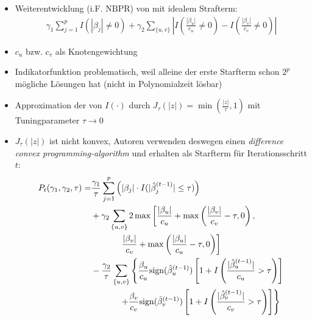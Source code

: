 \documentclass{beamer}
\begin{document}
\begin{frame}
	\begin{itemize}
	\item Weiterentwicklung (i.F. $\text{NBPR}$) von \cite{kim_network-based_2013} mit {\glqq}idealem{\grqq} Strafterm:
	\begin{align*}
	\gamma_1 \sum_{j=1}^{p}I(|\beta_j|\neq 0) + \gamma_2 \sum_{\{u,v\}}\left| I\left( \frac{|\beta_u|}{c_u} \neq 0 \right) - I\left( \frac{|\beta_v|}{c_v} \neq 0 \right) \right|
	\end{align*}
	\item $c_u$ bzw. $c_v$ als Knotengewichtung
	\item Indikatorfunktion problematisch, weil
	alleine der erste Starfterm schon $2^p$ mögliche Lösungen hat (nicht in Polynomialzeit lösbar)
	\item Approximation der von $I(\cdot)$ durch  $J_\tau(|z|)=\min (\frac{|z|}{\tau}, 1)$ mit Tuningparameter $\tau \rightarrow 0$
	\end{itemize}
\end{frame}


\begin{frame}
	\begin{itemize}
	\item $J_\tau(|z|)$ ist nicht konvex, Autoren verwenden deswegen einen \textit{difference convex programming-algorithm} und erhalten als Starfterm für Iterationsschritt $t$:
	\begin{align*}
	P_t(\gamma_1, \gamma_2, \tau) =& \frac{\gamma_1}{\tau} \sum_{j=1}^{p}\left(|\beta_j|\cdot I(|\hat{\beta}_j^{(t-1)}| \leq \tau)\right) \notag \\
	&+ \gamma_2 \sum_{\{u,v\}} 2\max \left[\frac{|\beta_u|}{c_u}+\max\left(\frac{|\beta_v|}{c_v}-\tau, 0\right), \right. \\
	&\phantom{{}=1111} \left.\frac{|\beta_v|}{c_v}+\max\left(\frac{|\beta_u|}{c_u}-\tau, 0\right)\right] \notag \\
	&- \frac{\gamma_2}{\tau} \sum_{\{u,v\}} \left\lbrace
	\frac{\beta_u}{c_u}\text{sign}(\hat{\beta}_u^{(t-1)}) \left[1+I\left(\frac{|\hat{\beta}_u^{(t-1)}|}{c_u}>\tau \right) \right] \right. \notag \\
	&\phantom{{}=1111} \left. + 
	\frac{\beta_v}{c_v}\text{sign}(\hat{\beta}_v^{(t-1)})\left[1+I\left(\frac{|\hat{\beta}_v^{(t-1)}|}{c_v}>\tau \right) \right]
	\right\rbrace
	\end{align*}
	\end{itemize}
\end{frame}
\end{document}
